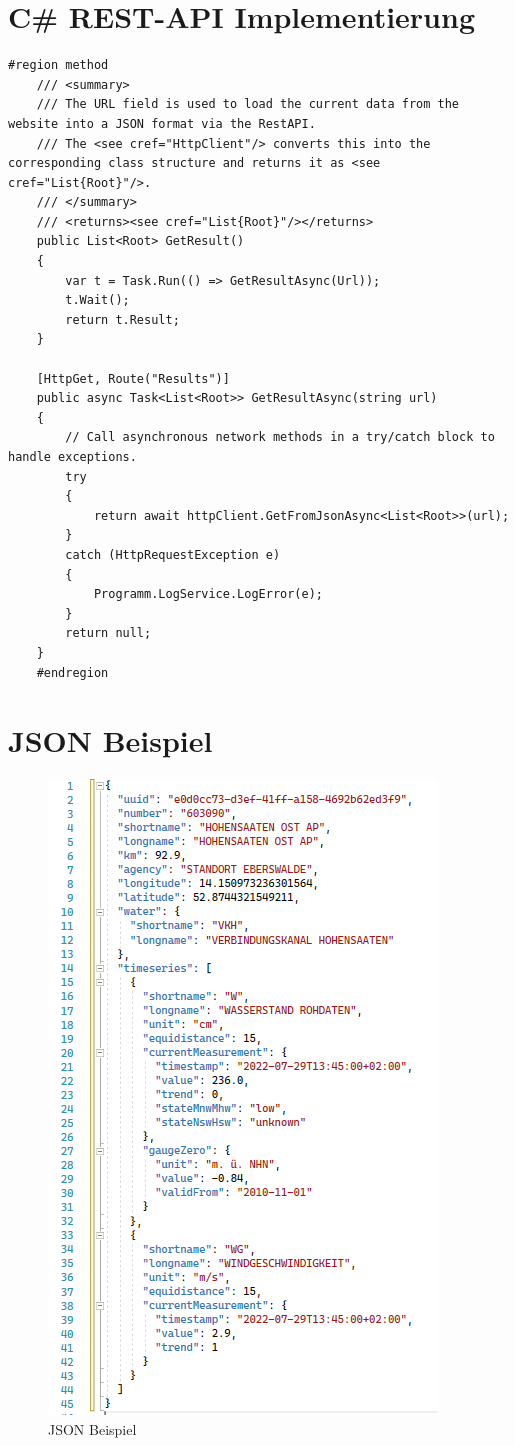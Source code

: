 \newpage
\appendix
\section{C\# REST-API Implementierung}
\begin{lstlisting}[language={[Sharp]C}, caption={REST-API C\# Implementierung}, captionpos=b, label={fig:restApi}]
    #region method
    /// <summary>
    /// The URL field is used to load the current data from the website into a JSON format via the RestAPI. 
    /// The <see cref="HttpClient"/> converts this into the corresponding class structure and returns it as <see cref="List{Root}"/>.
    /// </summary>
    /// <returns><see cref="List{Root}"/></returns>
    public List<Root> GetResult()
    {
        var t = Task.Run(() => GetResultAsync(Url));
        t.Wait();
        return t.Result;
    }

    [HttpGet, Route("Results")]
    public async Task<List<Root>> GetResultAsync(string url)
    {
        // Call asynchronous network methods in a try/catch block to handle exceptions.
        try
        {
            return await httpClient.GetFromJsonAsync<List<Root>>(url);
        }
        catch (HttpRequestException e)
        {
            Programm.LogService.LogError(e);
        }
        return null;
    }
    #endregion
\end{lstlisting}
\section{JSON Beispiel}
\begin{figure}[H]
    \centering
    \includegraphics[width=0.7\linewidth]{figures/Json_example.PNG} 
    \caption{JSON Beispiel}
    \label{fig:jsonExample}
\end{figure}
\newpage
